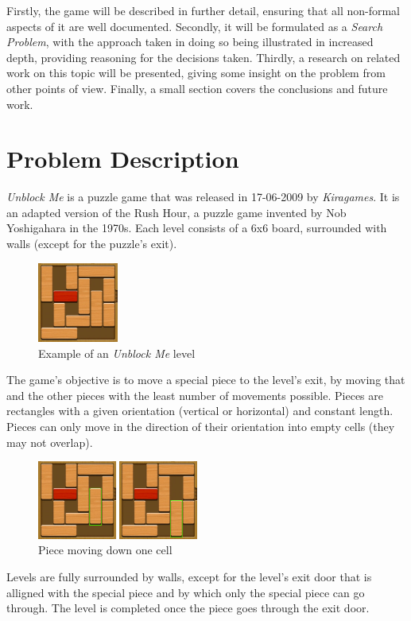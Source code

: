 \documentclass[conference]{IEEEtran}
\begin{document}
Firstly, the game will be described in further detail, ensuring that all non-formal aspects of it are well documented. Secondly, it will be formulated as a \textit{Search Problem}, with the approach taken in doing so being illustrated in increased depth, providing reasoning for the decisions taken. Thirdly, a research on related work on this topic will be presented, giving some insight on the problem from other points of view.
{\huge Finally, a small section covers the conclusions and future work.}

\section{Problem Description}
\textit{Unblock Me} is a puzzle game that was released in 17-06-2009 by \textit{Kiragames}. It is an adapted version of the Rush Hour, a puzzle game invented by Nob Yoshigahara in the 1970s. Each level consists of a 6x6 board, surrounded with walls (except for the puzzle's exit). 

\begin{figure}[H]
    \centerline{\includegraphics[width=100px]{img1.png}}
    \caption{Example of an \textit{Unblock Me} level}
    \label{fig}
\end{figure}

The game's objective is to move a special piece to the level's exit, by moving that and the other pieces with the least number of movements possible. Pieces are rectangles with a given orientation (vertical or horizontal) and constant length. Pieces can only move in the direction of their orientation into empty cells (they may not overlap).  

\begin{figure}[H]
    \centerline{\includegraphics[width=200px]{img2.png}}
    \caption{Piece moving down one cell}
    \label{fig}
\end{figure}

Levels are fully surrounded by walls, except for the level's exit door that is alligned with the special piece and by which only the special piece can go through. The level is completed once the piece goes through the exit door.
 
\end{document}
